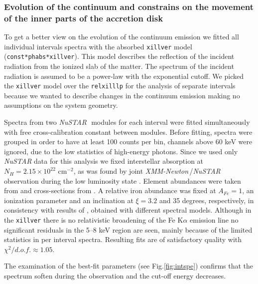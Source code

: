 \documentclass[a4paper,fleqn,usenatbib]{mnras}
\def\xmm{{\em XMM-Newton\,}}
\def\nustar{{\em NuSTAR\,}}
\begin{document}
\subsubsection{Evolution of the continuum and constrains on the movement of the inner parts of the accretion disk}
\label{sec:continuum_evolution}
To get a better view on the evolution of the continuum emission we fitted all individual intervals spectra with the absorbed \texttt{xillver} \citep{garcia13} model (\texttt{const*phabs*xillver}). 
This model describes the reflection of the incident radiation from the ionized slab of the matter. 
The spectrum of the incident radiation is assumed to be a power-law with the exponential cutoff. 
We picked the \texttt{xillver} model over the \texttt{relxilllp} for the analysis of separate intervals because we wanted to describe changes in the continuum emission making no assumptions on the system geometry. 

Spectra from two \nustar\, modules for each interval were fitted simultaneously with free cross-calibration constant between modules.
Before fitting, spectra were grouped in order to have at least 100 counts per bin, channels above 60 keV were ignored, due to the low statistics of high-energy photons. 
Since we used only {\it NuSTAR} data for this analysis we fixed interstellar absorption at $N_{H} = 2.15\times10^{22}$ cm$^{-2}$, as was found by joint \xmm/\nustar\, observation during the low luminosity state \citep{fuerst16}. 
Element abundances were taken from \cite{wilms00} and cross-sections from \cite{verner96}. 
A relative iron abundance was fixed at  $A_{Fe} = 1$, an ionization parameter and an inclination at $\xi=3.2$ and 35 degrees, respectively, in consistency with results of \citet{miller15_nust}, obtained with different spectral models. 
Although in the \texttt{xillver} there is no relativistic broadening of the Fe K$\alpha$ emission line no significant residuals in the 5--8 keV region are seen, mainly because of the limited statistics in per interval spectra. 
Resulting fits are of satisfactory quality with $\chi^{2}/d.o.f. \approx 1.05$. 
 
The examination of the best-fit parameters (see Fig.\ref{fig:intspe}) confirms that the spectrum soften during the observation and the cut-off energy decreases. 
\end{document}
